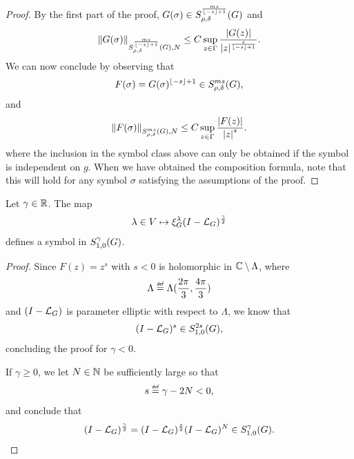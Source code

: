 \begin{proof}
    By the first part of the proof,
    $G(\sigma) \in \SymbolClass {\frac {m s} {\Floor {-s} +1}} {\rho, \delta}$ and
    \begin{align*}
        \SymbolSemiNorm {\frac {m s} {\Floor {-s} + 1}} {\rho, \delta} N {G(\sigma)}
        \leq C
        \sup_{z \in \Gamma} \frac {\abs {G(z)}} {\abs z^{\frac s {\Floor {-s} + 1}}}.
    \end{align*}
    We can now conclude by observing that
    \begin{align*}
        F(\sigma) = G(\sigma)^{\Floor {-s} + 1} \in \SymbolClass {m s} {\rho, \delta},
    \end{align*}
    and
    \begin{align*}
        \SymbolSemiNorm {m s} {\rho, \delta} N {F(\sigma)}
        \leq C
        \sup_{z \in \Gamma} \frac {\abs {F(z)}} {\abs z^s}.
    \end{align*}
    where the inclusion in the symbol class above can only be obtained
    if the symbol is independent on $g$.
    When we have obtained the composition formula,
    note that this will hold for any symbol $\sigma$ satisfying the assumptions of the proof.
\end{proof}

\begin{corollary}
\label{corollary:powers_of_the_Laplacian}
    Let $\gamma \in \R$.
    The map
    \begin{align*}
        \lambda \in \VectorSpace \mapsto \Rep \lambda \BesselPotential \gamma
    \end{align*}
    defines a symbol in $\SymbolClass \gamma {1, 0}$.
\end{corollary}
\begin{proof}
    Since $F(z) = z^s$ with $s < 0$ is holomorphic in $\C \setminus \Lambda$, where
    \begin{align*}
        \Lambda \defeq \Lambda(\frac {\turn} 3, \frac {4 \pi} 3)
    \end{align*}
    and $\BesselPotentialSquared {}$ is parameter elliptic with respect to $\Lambda$,
    we know that
    \begin{align*}
        \BesselPotentialSquared {s} \in \SymbolClass {2 s} {1, 0},
    \end{align*}
    concluding the proof for $\gamma < 0$.

    If $\gamma \geq 0$,
    we let $N \in \N$ be sufficiently large so that
    \begin{align*}
        s \defeq \gamma - 2N < 0,
    \end{align*}
    and conclude that
    \begin{align*}
        \BesselPotential \gamma = \BesselPotential s \BesselPotentialSquared N \in \SymbolClass \gamma {1, 0}.
    \end{align*}
\end{proof}

